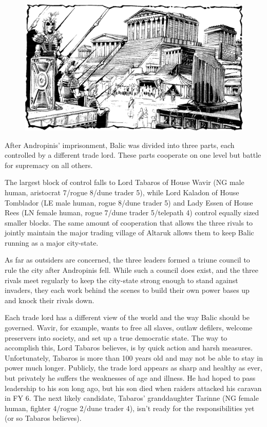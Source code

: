 {
\begin{figure}[b!]
\centering
\includegraphics[width=\textwidth]{images/balic-2.png}
\WOTC
\end{figure}

	After Andropinis' imprisonment, Balic was divided into three parts, each controlled by a different trade lord. These parts cooperate on one level but battle for supremacy on all others.

	The largest block of control falls to Lord Tabaros of House Wavir (NG male human, aristocrat 7/rogue 8/dune trader 5), while Lord Kaladon of House Tomblador (LE male human, rogue 8/dune trader 5) and Lady Essen of House Rees (LN female human, rogue 7/dune trader 5/telepath 4) control equally sized smaller blocks. The same amount of cooperation that allows the three rivals to jointly maintain the major trading village of Altaruk allows them to keep Balic running as a major city-state.

	As far as outsiders are concerned, the three leaders formed a triune council to rule the city after Andropinis fell. While such a council does exist, and the three rivals meet regularly to keep the city-state strong enough to stand against invaders, they each work behind the scenes to build their own power bases up and knock their rivals down.

	Each trade lord has a different view of the world and the way Balic should be governed. Wavir, for example, wants to free all slaves, outlaw defilers, welcome preservers into society, and set up a true democratic state. The way to accomplish this, Lord Tabaros believes, is by quick action and harsh measures. Unfortunately, Tabaros is more than 100 years old and may not be able to stay in power much longer. Publicly, the trade lord appears as sharp and healthy as ever, but privately he suffers the weaknesses of age and illness. He had hoped to pass leadership to his son long ago, but his son died when raiders attacked his caravan in FY 6. The next likely candidate, Tabaros' granddaughter Tarinne (NG female human, fighter 4/rogue 2/dune trader 4), isn't ready for the responsibilities yet (or so Tabaros believes).

}
